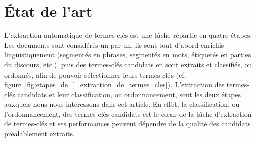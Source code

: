 \section{État de l'art}
\label{sec:etat_de_l_art}
  L'extraction automatique de termes-clés est une tâche répartie en quatre
  étapes. Les documents sont considérés un par un, ils sont tout d'abord
  enrichis linguistiquement (segmentés en phrases, segmentés en mots, étiquetés
  en parties du discours, etc.), puis des termes-clés candidats en sont extraits
  et classifiés, ou ordonnés, afin de pouvoir sélectionner leurs termes-clés
  (cf. figure~\ref{fig:etapes_de_l_extraction_de_termes_cles}). L'extraction des
  termes-clés candidats et leur classification, ou ordonnancement, sont les deux
  étapes auxquels nous nous intéressons dans cet article. En effet, la
  classification, ou l'ordonnancement, des termes-clés candidats est le c\oe{}ur
  de la tâche d'extraction de termes-clés et ses performances peuvent dépendre
  de la qualité des candidats préalablement extraits.
